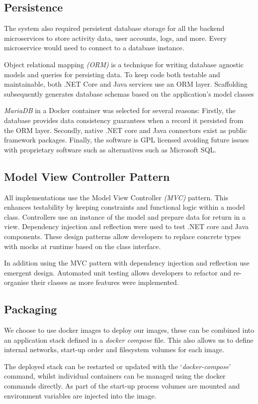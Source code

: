 \subsection{Persistence}
    \par
    The system also required persistent database storage for all the backend microservices to store activity data, user accounts, logs, and more. Every microservice would need to connect to a database instance.

    \par
    Object relational mapping \textit{(ORM)} is a technique for writing database agnostic models and queries for persisting data. To keep code both testable and maintainable, both .NET Core and Java services use an ORM layer. Scaffolding subsequently generates database schemas based on the application's model classes

    \par
    \textit{MariaDB}\cite{MariaDB} in a Docker container was selected for several reasons: Firstly, the database provides data consistency guarantees when a record it persisted from the ORM layer. Secondly, native .NET core and Java connectors exist as public framework packages. Finally, the software is GPL licensed avoiding future issues with proprietary software such as alternatives such as Microsoft SQL.

\subsection{Model View Controller Pattern}
    \par
    All implementations use the Model View Controller \textit{(MVC)}
    pattern. This enhances testability by keeping constraints and functional logic within a model class. Controllers use an instance of the model and prepare data for return in a view. Dependency injection and reflection were used to test .NET core and Java components. These design patterns allow developers to replace concrete types with mocks at runtime based on the class interface.

    \par
    In addition using the MVC pattern with dependency injection and reflection use emergent design. Automated unit testing allows developers to refactor and re-organise their classes as more features were implemented.

\subsection{Packaging}
    \par
    We choose to use docker images to deploy our images, these can be combined into an application stack defined in a \textit{docker compose} file. This also allows us to define internal networks, start-up order and filesystem volumes for each image.

    \par
    The deployed stack can be restarted or updated with the `\textit{docker-compose}' command, whilst individual containers can be managed using the docker commands directly. As part of the start-up process volumes are mounted and environment variables are injected into the image.